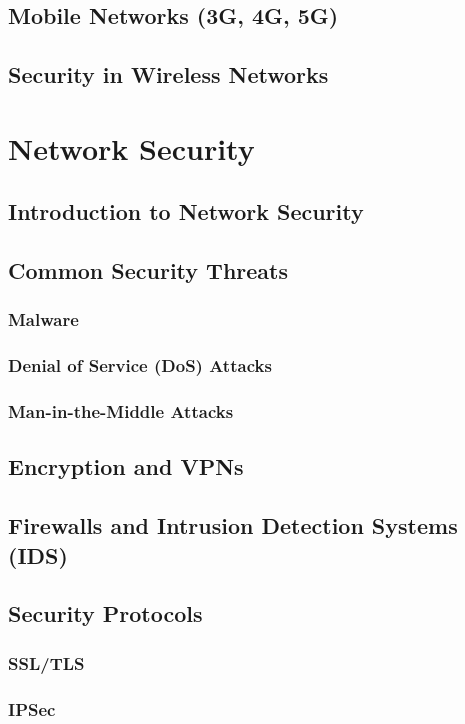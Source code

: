 \documentclass{book}
\begin{document}
    \section{Mobile Networks (3G, 4G, 5G)}
    \section{Security in Wireless Networks}
    
\chapter{Network Security}
    \section{Introduction to Network Security}
    \section{Common Security Threats}
        \subsection{Malware}
        \subsection{Denial of Service (DoS) Attacks}
        \subsection{Man-in-the-Middle Attacks}
    \section{Encryption and VPNs}
    \section{Firewalls and Intrusion Detection Systems (IDS)}
    \section{Security Protocols}
        \subsection{SSL/TLS}
        \subsection{IPSec}
\end{document}
